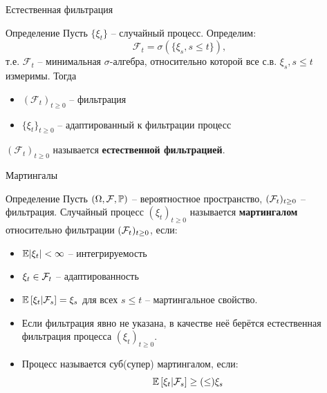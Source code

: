 \documentclass{beamer}
\begin{document}
\begin{frame}{Естественная фильтрация}
    \begin{block}{Определение}
        Пусть $\{\xi_t\}$ -- случайный процесс. Определим:
        $$
            \mathcal{F}_t = \sigma(\{\xi_s, s \leq t\}),
        $$т.е. $\mathcal{F}_t$ -- минимальная $\sigma$-алгебра, относительно которой все с.в. $\xi_s, s\leq t$ измеримы. Тогда 
        \begin{itemize}
            \item $\left(\mathcal{F}_t\right)_{t\geq 0}$ -- фильтрация
            \item $\{\xi_t\}_{t\geq 0}$ -- адаптированный к фильтрации процесс
        \end{itemize}
        $\left(\mathcal{F}_t\right)_{t\geq 0}$ называется \textbf{естественной фильтрацией}.    
    \end{block}

\end{frame}

\begin{frame}{Мартингалы}
    \begin{block}{Определение}
        Пусть $(\Omega, \mathcal{F}, \mathbb{P})$ -- вероятностное пространство, $(\mathcal{F}_t)_{t\geq 0}$ -- фильтрация. Случайный процесс $(\xi_t)_{t\geq 0}$ называется \textbf{мартингалом} относительно фильтрации $(\mathcal{F}_t)_{t\geq 0}$, если:
        \begin{itemize}
            \item $\mathbb{E} |\xi_t| < \infty$ -- интегрируемость
            \item $\xi_t \in \mathcal{F}_t$ -- адаптированность
            \item $\mathbb{E} \left[ \xi_t | \mathcal{F}_s\right] = \xi_s$ для всех $s\leq t$ -- мартингальное свойство.
        \end{itemize}
    \end{block}
    \begin{itemize}
        \item Если фильтрация явно не указана, в качестве неё берётся естественная фильтрация процесса $(\xi_t)_{t\geq 0}$.
        \item Процесс называется суб(супер) мартингалом, если:
    $$
        \mathbb{E} \left[ \xi_t | \mathcal{F}_s\right] \geq (\leq) \xi_s
    $$
    \end{itemize}
\end{frame}
\end{document}
